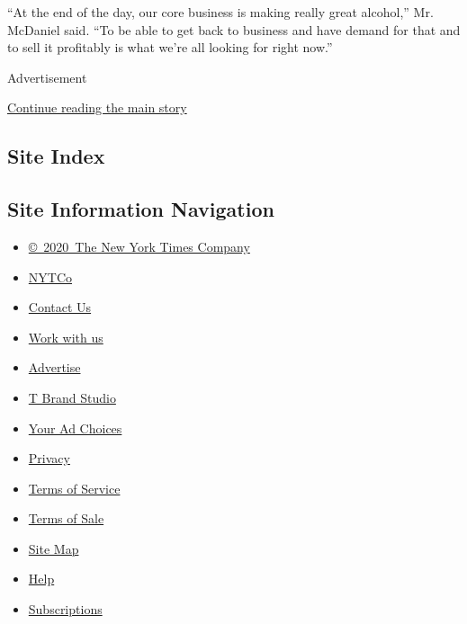 ``At the end of the day, our core business is making really great
alcohol,'' Mr. McDaniel said. ``To be able to get back to business and
have demand for that and to sell it profitably is what we're all looking
for right now.''

Advertisement

\protect\hyperlink{after-bottom}{Continue reading the main story}

\hypertarget{site-index}{%
\subsection{Site Index}\label{site-index}}

\hypertarget{site-information-navigation}{%
\subsection{Site Information
Navigation}\label{site-information-navigation}}

\begin{itemize}
\tightlist
\item
  \href{https://help.nytimes.com/hc/en-us/articles/115014792127-Copyright-notice}{©~2020~The
  New York Times Company}
\end{itemize}

\begin{itemize}
\tightlist
\item
  \href{https://www.nytco.com/}{NYTCo}
\item
  \href{https://help.nytimes.com/hc/en-us/articles/115015385887-Contact-Us}{Contact
  Us}
\item
  \href{https://www.nytco.com/careers/}{Work with us}
\item
  \href{https://nytmediakit.com/}{Advertise}
\item
  \href{http://www.tbrandstudio.com/}{T Brand Studio}
\item
  \href{https://www.nytimes.com/privacy/cookie-policy\#how-do-i-manage-trackers}{Your
  Ad Choices}
\item
  \href{https://www.nytimes.com/privacy}{Privacy}
\item
  \href{https://help.nytimes.com/hc/en-us/articles/115014893428-Terms-of-service}{Terms
  of Service}
\item
  \href{https://help.nytimes.com/hc/en-us/articles/115014893968-Terms-of-sale}{Terms
  of Sale}
\item
  \href{https://spiderbites.nytimes.com}{Site Map}
\item
  \href{https://help.nytimes.com/hc/en-us}{Help}
\item
  \href{https://www.nytimes.com/subscription?campaignId=37WXW}{Subscriptions}
\end{itemize}
